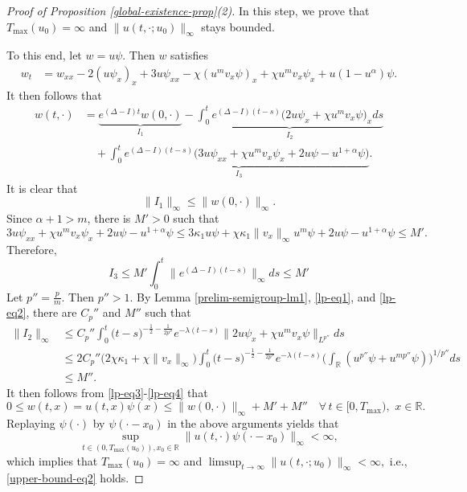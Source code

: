\documentclass[11pt]{article} %
\theoremstyle{remark}
\theoremstyle{remark}
\numberwithin{equation}{section}
\numberwithin{figure}{section}
\numberwithin{table}{section}
\newcommand\RR{\ensuremath{\mathbb{R}}}
\begin{document}
\begin{proof} [Proof of Proposition \ref{global-existence-prop}(2)]
 In this step, 
 we prove that  $T_{\max}(u_0)=\infty$ and $\|u(t,\cdot;u_0)\|_\infty$ stays bounded.

\smallskip

  To this end, let  $w=u\psi$. Then $w$ satisfies 
\begin{align*}
w_t&=w_{xx}-2(u\psi_x)_x+3 u\psi_{xx}-\chi (u^m v_x\psi)_x+\chi u^m v_x\psi_x+u(1-u^\alpha)\psi.
\end{align*}
It then follows that
\begin{align}
\label{lp-eq3}
w(t,\cdot)&=\underbrace{e^{(\Delta -I) t} w(0,\cdot)}_{I_1}-\underbrace{\int_0^ t e^{(\Delta -I)(t-s)}\big(2u\psi_x +\chi u^m v_x\psi\big)_x ds}_{I_2}\nonumber\\
&\quad +\underbrace{\int_0^t e^{(\Delta -I)(t-s)} \big(3 u \psi_{xx}+\chi u^m v_x\psi_x +2 u \psi -u^{1+\alpha}\psi\big)}_{I_3}.
\end{align}
It is clear that
\begin{equation}
\label{lp-eq4}
\|I_1\|_\infty\le \|w(0,\cdot)\|_\infty.
\end{equation}
Since $\alpha+1> m$,  there is $M'>0$ such that
$$
3 u \psi_{xx}+\chi u^m v_x\psi_x +2 u \psi -u^{1+\alpha}\psi\le 3\kappa_1 u \psi+\chi \kappa_1\|v_x\|_\infty u^m \psi +2 u\psi -u^{1+\alpha} \psi\le M'.
$$ 
Therefore, 
\begin{equation}
\label{lp-eq5}
I_3 \le M'\int_0^t \|e^{(\Delta-I)(t-s)}\|_\infty ds\le M'
\end{equation}
Let $p''=\frac{p}{m}$. Then $p''>1$. By Lemma \ref{prelim-semigroup-lm1}, \eqref{lp-eq1}, and \eqref{lp-eq2},   there  are $C_p''$ and $M''$  such that 
\begin{align}
\label{lp-eq6}
\|I_2\|_\infty&\le C_p'' \int_0 ^t \big(t-s\big)^{-\frac{1}{2}-\frac{1}{2p''}} e^{-\lambda (t-s)} \|2u\psi_x+\chi u^m v_x\psi\|_{L^{p''}} ds \nonumber\\
&\le 2 C_p'' \big(2\chi \kappa_1+\chi \|v_x\|_\infty\big)\int_0 ^t \big(t-s\big)^{-\frac{1}{2}-\frac{1}{2p''}} e^{-\lambda (t-s)}  \Big(\int_{\RR} (u^{p''}\psi +u^{mp''} \psi)\Big)^{1/p''} ds\nonumber\\
&\le M''.
\end{align}
It then  follows  from \eqref{lp-eq3}-\eqref{lp-eq4} that
$$ 0\le w(t,x)= u(t,x)\psi(x) \le \|w(0,\cdot)\|_\infty +M'+M''\quad \forall\, t\in [0,T_{\max}), \,\, x\in\RR.
$$
Replaying $\psi(\cdot)$ by $\psi(\cdot -x_0)$ in the above arguments yields
that
$$
\sup_{t\in (0,T_{\max}(u_0)), x_0\in\RR}\|u(t,\cdot) \psi(\cdot-x_0)\|_\infty <\infty,
$$
which implies that  $T_{\max}(u_0)=\infty$ and 
$
\limsup_{t\to \infty}\|u(t,\cdot;u_0)\|_\infty<\infty,
$ i.e., \eqref{upper-bound-eq2} holds.



\end{proof}
\end{document}
